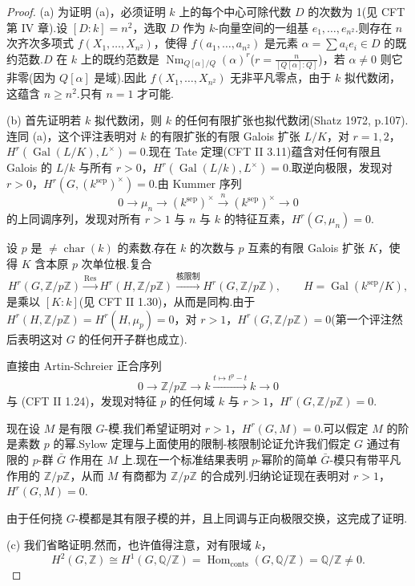 \begin{proof}
(a) 为证明 (a)，必须证明 $k$ 上的每个中心可除代数 $D$ 的次数为 1(见 CFT 第 IV 章).设 $[D \colon k] = n^{2}$，选取 $D$ 作为 $k$-向量空间的一组基 $e_1, \ldots, e_{n^2}$.则存在 $n$ 次齐次多项式 $f(X_1, \ldots, X_{n^2})$，使得 $f(a_1, \ldots, a_{n^2})$ 是元素 $\alpha = \sum a_i e_i \in D$ 的既约范数.$D$ 在 $k$ 上的既约范数是 $\operatorname{Nm}_{Q[\alpha]/Q}(\alpha)^{r}$($r = \frac{n}{[Q[\alpha] \colon Q]}$)，若 $\alpha \neq 0$ 则它非零(因为 $Q[\alpha]$ 是域).因此 $f(X_1, \ldots, X_{n^2})$ 无非平凡零点，由于 $k$ 拟代数闭，这蕴含 $n \geq n^{2}$.只有 $n = 1$ 才可能.

(b) 首先证明若 $k$ 拟代数闭，则 $k$ 的任何有限扩张也拟代数闭(Shatz 1972, p.107).连同 (a)，这个评注表明对 $k$ 的有限扩张的有限 Galois 扩张 $L/K$，对 $r = 1, 2$，$H^{r}(\operatorname{Gal}(L/K), L^{\times}) = 0$.现在 Tate 定理(CFT II 3.11)蕴含对任何有限且 Galois 的 $L/k$ 与所有 $r > 0$，$H^{r}(\operatorname{Gal}(L/k), L^{\times}) = 0$.取逆向极限，发现对 $r > 0$，$H^{r}(G, (k^{\mathrm{sep}})^{\times}) = 0$.由 Kummer 序列
\[
0 \to \mu_n \to (k^{\mathrm{sep}})^{\times} \xrightarrow{n} (k^{\mathrm{sep}})^{\times} \to 0
\]
的上同调序列，发现对所有 $r > 1$ 与 $n$ 与 $k$ 的特征互素，$H^{r}(G, \mu_n) = 0$.

设 $p$ 是 $\neq \operatorname{char}(k)$ 的素数.存在 $k$ 的次数与 $p$ 互素的有限 Galois 扩张 $K$，使得 $K$ 含本原 $p$ 次单位根.复合
\[
H^{r}(G, \mathbb{Z}/p\mathbb{Z}) \xrightarrow{\operatorname{Res}} H^{r}(H, \mathbb{Z}/p\mathbb{Z}) \xrightarrow{\text{核限制}} H^{r}(G, \mathbb{Z}/p\mathbb{Z}), \qquad H = \operatorname{Gal}(k^{\mathrm{sep}}/K),
\]
是乘以 $[K \colon k]$(见 CFT II 1.30)，从而是同构.由于 $H^{r}(H, \mathbb{Z}/p\mathbb{Z}) = H^{r}(H, \mu_p) = 0$，对 $r > 1$，$H^{r}(G, \mathbb{Z}/p\mathbb{Z}) = 0$(第一个评注然后表明这对 $G$ 的任何开子群也成立).

直接由 Artin-Schreier 正合序列
\[
0 \to \mathbb{Z}/p\mathbb{Z} \to k \xrightarrow{t \mapsto t^{p} - t} k \to 0
\]
与 (CFT II 1.24)，发现对特征 $p$ 的任何域 $k$ 与 $r > 1$，$H^{r}(G, \mathbb{Z}/p\mathbb{Z}) = 0$.

现在设 $M$ 是有限 $G$-模.我们希望证明对 $r > 1$，$H^{r}(G, M) = 0$.可以假定 $M$ 的阶是素数 $p$ 的幂.Sylow 定理与上面使用的限制-核限制论证允许我们假定 $G$ 通过有限的 $p$-群 $\bar{G}$ 作用在 $M$ 上.现在一个标准结果表明 $p$-幂阶的简单 $\bar{G}$-模只有带平凡作用的 $\mathbb{Z}/p\mathbb{Z}$，从而 $M$ 有商都为 $\mathbb{Z}/p\mathbb{Z}$ 的合成列.归纳论证现在表明对 $r > 1$，$H^{r}(G, M) = 0$.

由于任何挠 $G$-模都是其有限子模的并，且上同调与正向极限交换，这完成了证明.

(c) 我们省略证明.然而，也许值得注意，对有限域 $k$，
\[
H^{2}(G, \mathbb{Z}) \cong H^{1}(G, \mathbb{Q}/\mathbb{Z}) = \operatorname{Hom}_{\mathrm{conts}}(G, \mathbb{Q}/\mathbb{Z}) = \mathbb{Q}/\mathbb{Z} \neq 0.
\]
\end{proof}

